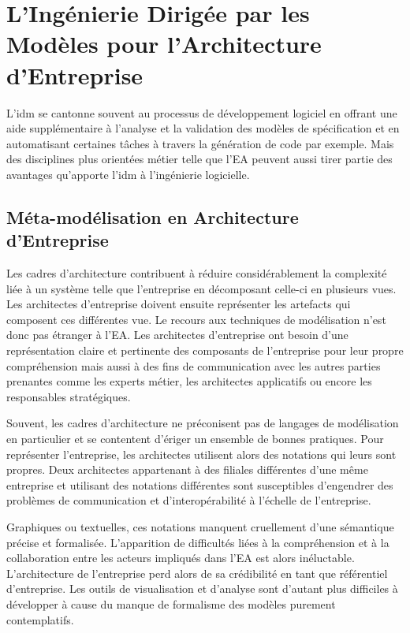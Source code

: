 \section{L'Ingénierie Dirigée par les Modèles pour l'Architecture d'Entreprise}

L'\gls{idm} se cantonne souvent au processus de développement logiciel en offrant une aide supplémentaire à l'analyse et la validation des modèles de spécification et en automatisant certaines tâches à travers la génération de code par exemple. Mais des disciplines plus orientées métier telle que l'EA peuvent aussi tirer partie des avantages qu'apporte l'\gls{idm} à l'ingénierie logicielle. 

\subsection{Méta-modélisation en Architecture d'Entreprise}

Les cadres d'architecture contribuent à réduire considérablement la complexité liée à un système telle que l'entreprise en décomposant celle-ci en plusieurs vues. Les architectes d'entreprise doivent ensuite représenter les artefacts qui composent ces différentes vue. Le recours aux techniques de modélisation n'est donc pas étranger à l'EA. Les architectes d'entreprise ont besoin d'une représentation claire et pertinente des composants de l'entreprise pour leur propre compréhension mais aussi à des fins de communication avec les autres parties prenantes comme les experts métier, les architectes applicatifs ou encore les responsables stratégiques. 

Souvent, les cadres d'architecture ne préconisent pas de langages de modélisation en particulier et se contentent d'ériger un ensemble de bonnes pratiques. Pour représenter l'entreprise, les architectes utilisent alors des notations qui leurs sont propres. Deux architectes appartenant à des filiales différentes d'une même entreprise et utilisant des notations différentes sont susceptibles d'engendrer des problèmes de communication et d'interopérabilité à l'échelle de l'entreprise. 

Graphiques ou textuelles, ces notations manquent cruellement d'une sémantique précise et formalisée. L'apparition de difficultés liées à la compréhension et à la collaboration entre les acteurs impliqués dans l'EA est alors inéluctable. L'architecture de l'entreprise perd alors de sa crédibilité en tant que référentiel d'entreprise. Les outils de visualisation et d'analyse sont d'autant plus difficiles à développer à cause du manque de formalisme des modèles purement contemplatifs.

